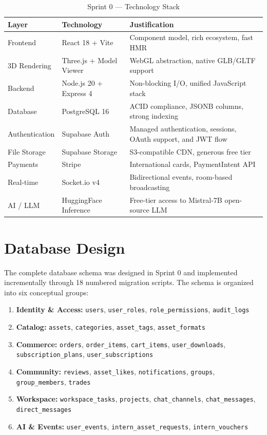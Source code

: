 \begin{table}[H]
\centering
\caption{Sprint 0 --- Technology Stack}
\begin{tabular}{L{3cm} L{4.5cm} L{6cm}}
\toprule
\textbf{Layer} & \textbf{Technology} & \textbf{Justification} \\
\midrule
Frontend       & React 18 + Vite         & Component model, rich ecosystem, fast HMR \\
3D Rendering   & Three.js + Model Viewer & WebGL abstraction, native GLB/GLTF support \\
Backend        & Node.js 20 + Express 4  & Non-blocking I/O, unified JavaScript stack \\
Database       & PostgreSQL 16           & ACID compliance, JSONB columns, strong indexing \\
Authentication & Supabase Auth           & Managed authentication, sessions, OAuth support, and JWT flow \\
File Storage   & Supabase Storage        & S3-compatible CDN, generous free tier \\
Payments       & Stripe                  & International cards, PaymentIntent API \\
Real-time      & Socket.io v4            & Bidirectional events, room-based broadcasting \\
AI / LLM       & HuggingFace Inference   & Free-tier access to Mistral-7B open-source LLM \\
\bottomrule
\end{tabular}
\end{table}

\section{Database Design}

The complete database schema was designed in Sprint 0 and implemented incrementally through 18 numbered migration scripts. The schema is organized into six conceptual groups:

\begin{enumerate}
  \item \textbf{Identity \& Access:} \texttt{users}, \texttt{user\_roles}, \texttt{role\_permissions}, \texttt{audit\_logs}
  \item \textbf{Catalog:} \texttt{assets}, \texttt{categories}, \texttt{asset\_tags}, \texttt{asset\_formats}
  \item \textbf{Commerce:} \texttt{orders}, \texttt{order\_items}, \texttt{cart\_items}, \texttt{user\_downloads}, \texttt{subscription\_plans}, \texttt{user\_subscriptions}
  \item \textbf{Community:} \texttt{reviews}, \texttt{asset\_likes}, \texttt{notifications}, \texttt{groups}, \texttt{group\_members}, \texttt{trades}
  \item \textbf{Workspace:} \texttt{workspace\_tasks}, \texttt{projects}, \texttt{chat\_channels}, \texttt{chat\_messages}, \texttt{direct\_messages}
  \item \textbf{AI \& Events:} \texttt{user\_events}, \texttt{intern\_asset\_requests}, \texttt{intern\_vouchers}
\end{enumerate}

